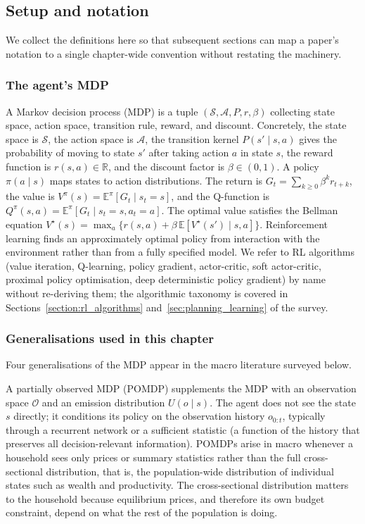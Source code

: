 \subsection{Setup and notation}
\label{sec:macro:setup}

We collect the definitions here so that subsequent sections can map a
paper's notation to a single chapter-wide convention without
restating the machinery.

\subsubsection{The agent's MDP}

A Markov decision process (MDP) is a tuple $(\mathcal S, \mathcal A,
P, r, \beta)$ collecting state space, action space, transition rule,
reward, and discount. Concretely, the state space is $\mathcal S$,
the action space is $\mathcal A$, the transition kernel
$P(s' \mid s, a)$ gives the probability of moving to state $s'$ after
taking action $a$ in state $s$, the reward function is
$r(s, a) \in \mathbb R$, and the discount factor is
$\beta \in (0, 1)$. A
policy $\pi(a \mid s)$ maps states to action distributions. The
return is $G_t = \sum_{k \ge 0} \beta^k r_{t+k}$, the value is
$V^\pi(s) = \mathbb E^\pi[G_t \mid s_t = s]$, and the Q-function is
$Q^\pi(s, a) = \mathbb E^\pi[G_t \mid s_t = s, a_t = a]$. The optimal
value satisfies the Bellman equation
$V^\star(s) = \max_a \{ r(s, a) + \beta\, \mathbb E[V^\star(s') \mid s,
a]\}$. Reinforcement learning finds an approximately optimal policy
from interaction with the environment rather than from a fully
specified model. We refer to RL algorithms (value iteration,
Q-learning, policy gradient, actor-critic, soft actor-critic, proximal
policy optimisation, deep deterministic policy gradient) by name
without re-deriving them; the algorithmic taxonomy is covered in
Sections~\ref{section:rl_algorithms} and~\ref{sec:planning_learning} of
the survey.

\subsubsection{Generalisations used in this chapter}

Four generalisations of the MDP appear in the macro literature
surveyed below.

A partially observed MDP (POMDP) supplements the MDP with an
observation space $\mathcal O$ and an emission distribution
$U(o \mid s)$. The agent does not see the state $s$ directly; it
conditions its policy on the observation history $o_{0:t}$, typically
through a recurrent network or a sufficient statistic (a function of
the history that preserves all decision-relevant information).
POMDPs arise in macro whenever a household sees only prices or
summary statistics rather than the full cross-sectional distribution,
that is, the population-wide distribution of individual states such
as wealth and productivity. The cross-sectional distribution matters
to the household because equilibrium prices, and therefore its own
budget constraint, depend on what the rest of the population is
doing.

